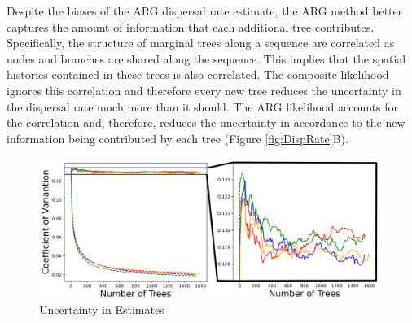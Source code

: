 Despite the biases of the ARG dispersal rate estimate, the ARG method better captures the amount of information that each additional tree contributes. Specifically, the structure of marginal trees along a sequence are correlated as nodes and branches are shared along the sequence. This implies that the spatial histories contained in these trees is also correlated. The composite likelihood ignores this correlation and therefore every new tree reduces the uncertainty in the dispersal rate much more than it should. The ARG likelihood accounts for the correlation and, therefore, reduces the uncertainty in accordance to the new information being contributed by each tree (Figure \ref{fig:DispRate}B).
\begin{figure}[h]
    \includegraphics[width=\linewidth]{Images/SupplementaryFigures/CoeffVar_DispersalRate/CoeffVarCombined.png}
    \caption{Uncertainty in Estimates}
    
\end{figure}